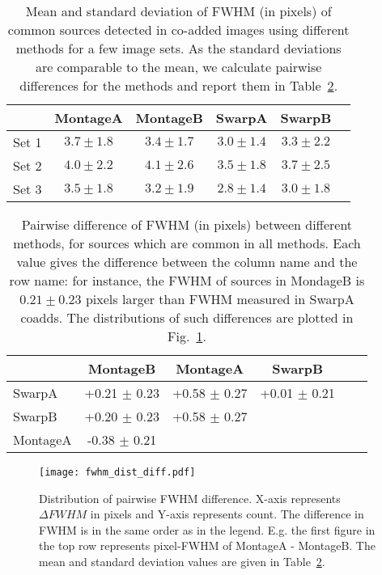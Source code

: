 \documentclass[fleqn,usenatbib]{mnras}
\begin{document}
\begin {table}
 \label{tab:psf} 
\begin{center}
\begin{tabular}{lccccc}
\hline
  &MontageA & MontageB & SwarpA &SwarpB\\
  \hline
Set 1 &  $3.7 \pm 1.8$ & $3.4 \pm 1.7$ & $3.0 \pm 1.4$ & $3.3 \pm 2.2$ \\
Set 2 &  $4.0 \pm 2.2$ & $4.1 \pm 2.6$ & $3.5 \pm 1.8$ & $3.7 \pm 2.5$  \\
Set 3 &  $3.5 \pm 1.8$ & $3.2 \pm 1.9$ & $2.8 \pm 1.4$ & $3.0 \pm 1.8$  \\
\hline
\end{tabular}
\end{center}
\caption{Mean and standard deviation of FWHM (in pixels) of common sources detected in co-added images using different methods for a few image sets. As the standard deviations are comparable to the mean, we calculate pairwise differences for the methods and report them in Table~\ref{tab:pairfwhm}.}
\end {table}


\begin {table}
\label{tab:psf2} 
\begin{center}
\begin{tabular}{lccccc}
& MontageB & MontageA & SwarpB\\
 \hline
 SwarpA & +0.21 $\pm$ 0.23& +0.58 $\pm$ 0.27  &+0.01 $\pm$ 0.21 \\
 SwarpB & +0.20 $\pm$ 0.23 & +0.58 $\pm$ 0.27  &  \\
  MontageA & -0.38 $\pm$ 0.21 & & \\
\hline
\end{tabular}
\end{center}
\caption{\label{tab:pairfwhm} Pairwise difference of FWHM (in pixels) between different methods, for sources which are common in all methods. Each value gives the difference between the column name and the row name: for instance, the FWHM of sources in MondageB is $0.21 \pm 0.23$ pixels larger than FWHM measured in SwarpA coadds. The distributions of such differences are plotted in Fig.~\ref{fig:diff_fwhm}.}
\end {table}




\begin{figure}
\texttt{[image: fwhm\_dist\_diff.pdf]}
\caption{Distribution of pairwise FWHM difference. X-axis represents $\Delta FWHM$ in pixels and Y-axis represents count. The difference in FWHM is in the same order as in the legend. E.g. the first figure in the top row represents pixel-FWHM of MontageA - MontageB. The mean and standard deviation values are given in Table~\ref{tab:pairfwhm}.}
\label{fig:diff_fwhm} 
\end{figure}
\end{document}
